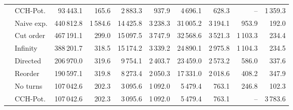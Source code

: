 \begin{tabular}{llrrrrrrrr}
       & CCH-Pot. &                  93\,443.1 &           165.6 &                                          2\,883.3 &                                            937.9 &                                            4\,696.1 &                                              628.3 &    -- & 1\,359.3 \\
       & Naive exp. &                 440\,812.8 &          1\,584.6 &                                         14\,425.8 &                                           3\,238.3 &                                           31\,005.2 &                                             3\,194.1 &  953.9 &  192.0 \\
       & Cut order &                 467\,191.1 &           299.0 &                                         15\,097.5 &                                           3\,747.9 &                                           32\,568.6 &                                             3\,521.3 & 1\,103.3 &  234.4 \\
       & Infinity &                 388\,201.7 &           318.5 &                                         15\,174.2 &                                           3\,339.2 &                                           24\,890.1 &                                             2\,975.8 & 1\,104.3 &  234.5 \\
       & Directed &                 206\,970.0 &           319.6 &                                          9\,754.1 &                                           2\,403.7 &                                           23\,459.0 &                                             2\,573.2 &  586.0 &  337.6 \\
       & Reorder &                 190\,597.1 &           319.8 &                                          8\,273.4 &                                           2\,050.3 &                                           17\,331.0 &                                             2\,018.6 &  408.2 &  347.9 \\
\addlinespace \multirow{7}{*}{\rotatebox[origin=c]{90}{Europe Turns}} & No turns &                 107\,042.6 &           202.3 &                                          3\,095.6 &                                           1\,092.0 &                                            5\,479.4 &                                              763.1 &  246.8 &  102.3 \\
       & CCH-Pot. &                 107\,042.6 &           202.3 &                                          3\,095.6 &                                           1\,092.0 &                                            5\,479.4 &                                              763.1 &    -- & 3\,783.6 \\

\end{tabular}
